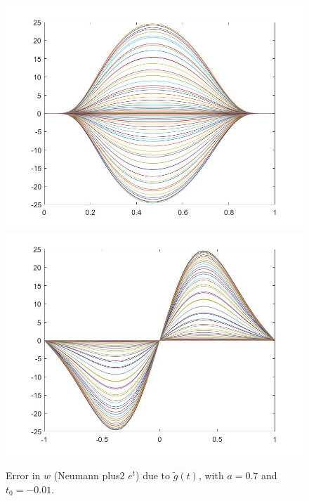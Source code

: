 \documentclass[11pt, a4paper]{article}
\theoremstyle{definition}
\begin{document}
\begin{figure}[h]
	\includegraphics[scale=0.3]{PerttimeN1.jpg}
	\includegraphics[scale=0.3]{PerttimeN2.jpg}
	\caption{Error in $w$ (Neumann plus2 $e^t$) due to $\tilde g(t)$, with $a =0.7$ and $t_0 = -0.01$.}
	\label{Perttime2}
\end{figure}
\end{document}
